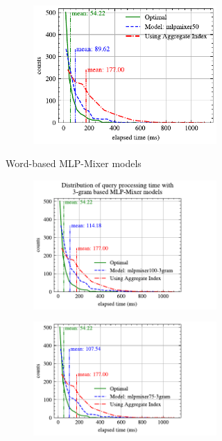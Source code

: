 \documentclass[conference]{IEEEtran}
\begin{document}
\begin{figure}[!h]
\begin{subfigure}{0.45\textwidth}
\begin{subfigure}{\textwidth}
			\includegraphics[]{graphics/perf_dist_mlpmixer50_B.pdf}
		\end{subfigure}
		\caption{Word-based MLP-Mixer models}
	\end{subfigure}
	\hfill
	\begin{subfigure}{0.45\textwidth}
		\begin{subfigure}{\textwidth}
			\centering
			\includegraphics[]{graphics/perf_dist_mlpmixer100_3gram_B.pdf}
		\end{subfigure}
		\vfill
		\begin{subfigure}{\textwidth}
			\centering
			\includegraphics[]{graphics/perf_dist_mlpmixer75_3gram_B.pdf}

\end{subfigure}
\end{subfigure}
\end{figure}
\end{document}
